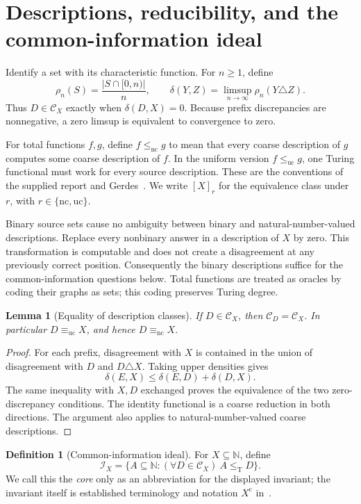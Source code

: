 \documentclass[11pt,a4paper]{article}
\newcommand{\N}{\mathbb N}
\newcommand{\leT}{\leq_{\mathrm T}}
\newcommand{\nc}{\mathrm{nc}}
\newcommand{\uc}{\mathrm{uc}}
\newcommand{\CD}{\mathcal C}
\newcommand{\core}{\mathcal I}
\newtheorem{lemma}[theorem]{Lemma}
\theoremstyle{definition}\newtheorem{definition}[theorem]{Definition}
\theoremstyle{remark}\newtheorem{remark}[theorem]{Remark}
\begin{document}
\section{Descriptions, reducibility, and the common-information ideal}
\label{sec:definitions}
Identify a set with its characteristic function. For $n\ge1$, define
\[
 \rho_n(S)=\frac{|S\cap[0,n)|}{n},\qquad
 \delta(Y,Z)=\limsup_{n\to\infty}\rho_n(Y\triangle Z).
\]
Thus $D\in\CD_X$ exactly when $\delta(D,X)=0$. Because prefix discrepancies
are nonnegative, a zero limsup is equivalent to convergence to zero.

For total functions $f,g$, define $f\le_{\nc}g$ to mean that every coarse
description of $g$ computes some coarse description of $f$. In the uniform
version $f\le_{\uc}g$, one Turing functional must work for every source
description. These are the conventions of the supplied report and
Gerdes~\cite{Gerdes}. We write $[X]_r$ for the equivalence class under $r$, with
$r\in\{\nc,\uc\}$.

Binary source sets cause no ambiguity between binary and natural-number-valued
descriptions. Replace every nonbinary answer in a description of $X$ by zero.
This transformation is computable and does not create a disagreement at any
previously correct position. Consequently the binary descriptions suffice for
the common-information questions below. Total functions are treated as oracles
by coding their graphs as sets; this coding preserves Turing degree.

\begin{lemma}[Equality of description classes]\label{lem:sameclass}
If $D\in\CD_X$, then $\CD_D=\CD_X$. In particular
$D\equiv_{\uc}X$, and hence $D\equiv_{\nc}X$.
\end{lemma}
\begin{proof}
For each prefix, disagreement with $X$ is contained in the union of
disagreement with $D$ and $D\triangle X$. Taking upper densities gives
\[
 \delta(E,X)\le\delta(E,D)+\delta(D,X).
\]
The same inequality with $X,D$ exchanged proves the equivalence of the two
zero-discrepancy conditions. The identity functional is a coarse reduction
in both directions. The argument also applies to natural-number-valued
coarse descriptions.
\end{proof}

\begin{definition}[Common-information ideal]
For $X\subseteq\N$, define
\[
 \core_X=\{A\subseteq\N:(\forall D\in\CD_X)\ A\leT D\}.
\]
We call this the \emph{core} only as an abbreviation for the displayed
invariant; the invariant itself is established terminology and notation
$X^{\mathrm c}$ in~\cite[Definition~3.1]{HJKS}.
\end{definition}
\end{document}
